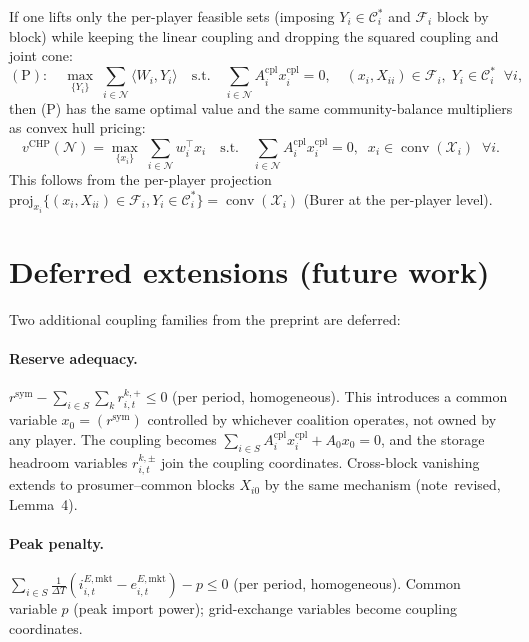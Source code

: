\documentclass[11pt]{article}
\theoremstyle{definition}
\newcommand{\CP}{\mathcal{C}^{*}}
\newcommand{\N}{\mathcal{N}}
\newcommand{\inner}[2]{\langle #1, #2 \rangle}
\newcommand{\conv}{\operatorname{conv}}
\newcommand{\xcom}{x^{\mathrm{cpl}}}
\newcommand{\Acom}{A^{\mathrm{cpl}}}
\newcommand{\feas}{\mathcal{X}}
\newcommand{\liftset}{\mathcal{F}}
\newcommand{\vchp}{v^{\mathrm{CHP}}}
\begin{document}
If one lifts only the per-player feasible sets (imposing $Y_i\in\CP_i$
and $\liftset_i$ block by block) while keeping the linear coupling and
dropping the squared coupling and joint cone:
\begin{equation}
\mathrm{(P)}:\quad
\max_{\{Y_i\}}\;\sum_{i\in\N}\inner{W_i}{Y_i}
\quad\text{s.t.}\quad
\sum_{i\in\N}\Acom_i\xcom_i=0,\quad
(x_i,X_{ii})\in\liftset_i,\;Y_i\in\CP_i\;\;\forall i,
\label{eq:chp-lift}
\end{equation}
then (P) has the same optimal value and the same community-balance
multipliers as convex hull pricing:
\begin{equation}
\vchp(\N)=\max_{\{x_i\}}\;\sum_{i\in\N}w_i^{\top}x_i
\quad\text{s.t.}\quad
\sum_{i\in\N}\Acom_i\xcom_i=0,\;\;
x_i\in\conv(\feas_i)\;\;\forall i.
\label{eq:chp}
\end{equation}
This follows from the per-player projection
$\mathrm{proj}_{x_i}\{(x_i,X_{ii})\in\liftset_i,Y_i\in\CP_i\}
=\conv(\feas_i)$ (Burer at the per-player level).

\section{Deferred extensions (future work)}
\label{sec:deferred}

Two additional coupling families from the preprint are deferred:

\paragraph{Reserve adequacy.}
$r^{\mathrm{sym}}-\sum_{i\in S}\sum_k r^{k,+}_{i,t}\le0$ (per period,
homogeneous).  This introduces a common variable
$x_0=(r^{\mathrm{sym}})$ controlled by whichever coalition operates,
not owned by any player.  The coupling becomes
$\sum_{i\in S}\Acom_i\xcom_i+A_0x_0=0$, and the storage headroom
variables $r^{k,\pm}_{i,t}$ join the coupling coordinates.  Cross-block
vanishing extends to prosumer--common blocks $X_{i0}$ by the same
mechanism (note~revised, Lemma~4).

\paragraph{Peak penalty.}
$\sum_{i\in S}\tfrac{1}{\Delta T}(i^{E,\mathrm{mkt}}_{i,t}
-e^{E,\mathrm{mkt}}_{i,t})-p\le0$ (per period, homogeneous).  Common
variable $p$ (peak import power); grid-exchange variables become
coupling coordinates.
\end{document}
